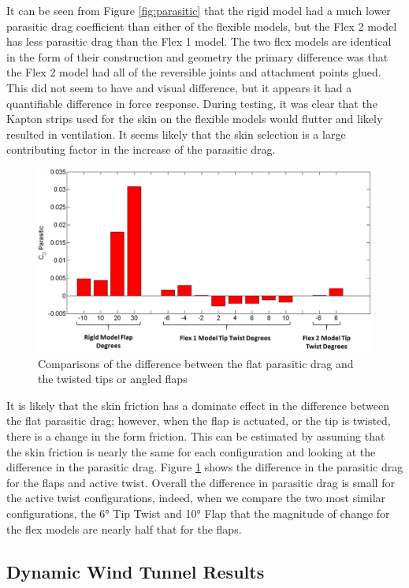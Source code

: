 \documentclass[11pt]{ucthesis}
\begin{document}
It can be seen from Figure \ref{fig:parasitic} that the rigid model had a much lower parasitic drag coefficient than either of the flexible models, but the Flex 2 model has less parasitic drag than the Flex 1 model. The two flex models are identical in the form of their construction and geometry the primary difference was that the Flex 2 model had all of the reversible joints and attachment points glued. This did not seem to have and visual difference, but it appears it had a quantifiable difference in force response. During testing, it was clear that the Kapton strips used for the skin on the flexible models would flutter and likely resulted in ventilation. It seems likely that the skin selection is a large contributing factor in the increase of the parasitic drag.

\begin{figure}[thpb]
\centering
\includegraphics[width=.75\linewidth]{Figures/CdPDiffCompare.png}
\caption{Comparisons of the difference between the flat parasitic drag and the twisted tips or angled flaps}
\label{fig:parasiticDiff}
\end{figure}

It is likely that the skin friction has a dominate effect in the difference between the flat parasitic drag; however, when the flap is actuated, or the tip is twisted, there is a change in the form friction. This can be estimated by assuming that the skin friction is nearly the same for each configuration and looking at the difference in the parasitic drag. Figure \ref{fig:parasiticDiff} shows the difference in the parasitic drag for the flaps and active twist. Overall the difference in parasitic drag is small for the active twist configurations, indeed, when we compare the two most similar configurations, the 6° Tip Twist and 10° Flap that the magnitude of change for the flex models are nearly half that for the flaps.

\subsection{Dynamic Wind Tunnel Results}
\label{sec:DWTR}
\end{document}
